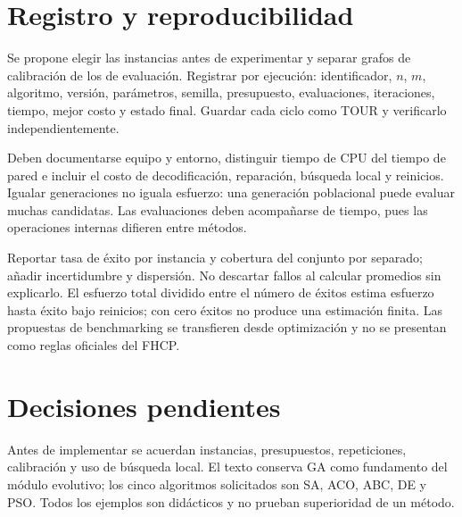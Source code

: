 \section{Registro y reproducibilidad}
Se propone elegir las instancias antes de experimentar y separar grafos de calibración de los de evaluación. Registrar por ejecución: identificador, $n$, $m$, algoritmo, versión, parámetros, semilla, presupuesto, evaluaciones, iteraciones, tiempo, mejor costo y estado final. Guardar cada ciclo como TOUR y verificarlo independientemente.

Deben documentarse equipo y entorno, distinguir tiempo de CPU del tiempo de pared e incluir el costo de decodificación, reparación, búsqueda local y reinicios. Igualar generaciones no iguala esfuerzo: una generación poblacional puede evaluar muchas candidatas. Las evaluaciones deben acompañarse de tiempo, pues las operaciones internas difieren entre métodos.\cite{de5,de6}

Reportar tasa de éxito por instancia y cobertura del conjunto por separado; añadir incertidumbre y dispersión. No descartar fallos al calcular promedios sin explicarlo. El esfuerzo total dividido entre el número de éxitos estima esfuerzo hasta éxito bajo reinicios; con cero éxitos no produce una estimación finita. Las propuestas de benchmarking se transfieren desde optimización y no se presentan como reglas oficiales del FHCP.\cite{de5,de6}

\section{Decisiones pendientes}
Antes de implementar se acuerdan instancias, presupuestos, repeticiones, calibración y uso de búsqueda local. El texto conserva GA como fundamento del módulo evolutivo; los cinco algoritmos solicitados son SA, ACO, ABC, DE y PSO. Todos los ejemplos son didácticos y no prueban superioridad de un método.
